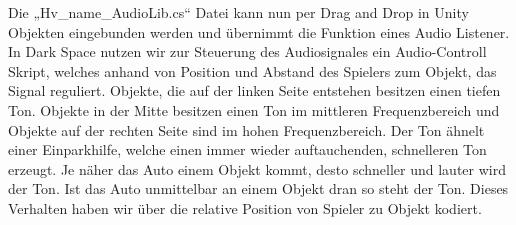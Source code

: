 \documentclass[a4paper, 11pt]{scrartcl}
\begin{document}
Die „Hv\_name\_AudioLib.cs“ Datei kann nun per Drag and Drop in Unity Objekten
eingebunden werden und übernimmt die Funktion eines Audio Listener.
In Dark Space nutzen wir zur Steuerung des Audiosignales ein Audio-Controll Skript, welches anhand von Position und Abstand des Spielers zum Objekt, das Signal reguliert. Objekte, die auf der linken Seite entstehen besitzen einen tiefen Ton. Objekte in der Mitte besitzen einen Ton im mittleren Frequenzbereich und Objekte auf der rechten Seite sind im hohen Frequenzbereich. Der Ton ähnelt einer Einparkhilfe, welche einen immer wieder auftauchenden, schnelleren Ton erzeugt. Je näher das Auto einem Objekt kommt, desto schneller und lauter wird der Ton. Ist das Auto unmittelbar an einem Objekt dran so steht der Ton. Dieses Verhalten haben wir über die relative Position von Spieler zu Objekt kodiert. 
\end{document}
